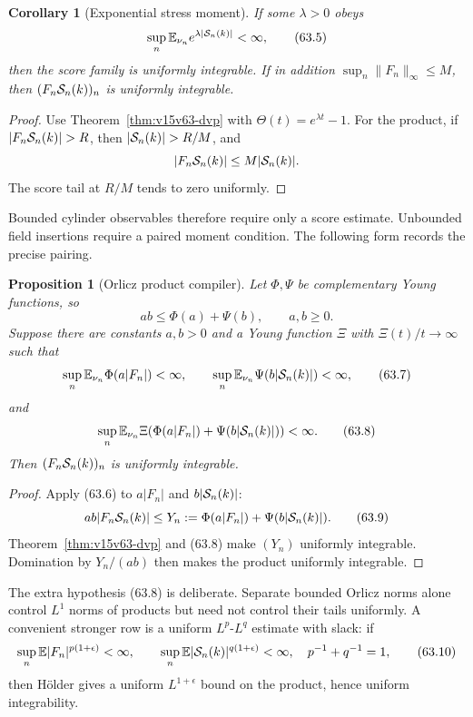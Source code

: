 \documentclass[11pt]{article}
\newtheorem{proposition}[theorem]{Proposition}
\newtheorem{corollary}[theorem]{Corollary}
\theoremstyle{remark}
\begin{document}
\begin{corollary}[Exponential stress moment]
\label{cor:v15v63-exp-ui}
If some \(\lambda>0\) obeys
\[
 \sup_n\mathbb E_{\nu_n}e^{\lambda|{\cal S}_n(k)|}
 <\infty,                                             \tag{63.5}
\]
then the score family is uniformly integrable.  If in addition
\(\sup_n\|F_n\|_\infty\leq M\), then
\((F_n{\cal S}_n(k))_n\) is uniformly integrable.
\end{corollary}

\begin{proof}
Use Theorem~\ref{thm:v15v63-dvp} with
\(\Theta(t)=e^{\lambda t}-1\).  For the product, if
\(|F_n{\cal S}_n(k)|>R\), then
\(|{\cal S}_n(k)|>R/M\), and
\[
 |F_n{\cal S}_n(k)|
 \leq M|{\cal S}_n(k)|.
\]
The score tail at \(R/M\) tends to zero uniformly.
\end{proof}

Bounded cylinder observables therefore require only a score
estimate.  Unbounded field insertions require a paired moment
condition.  The following form records the precise pairing.

\begin{proposition}[Orlicz product compiler]
\label{prop:v15v63-orlicz-product}
Let \(\Phi,\Psi\) be complementary Young functions, so
\[
 ab\leq\Phi(a)+\Psi(b),\qquad a,b\geq0.               \tag{63.6}
\]
Suppose there are constants \(a,b>0\) and a Young function
\(\Xi\) with \(\Xi(t)/t\to\infty\) such that
\[
 \sup_n\mathbb E_{\nu_n}\Phi(a|F_n|)<\infty,
 \qquad
 \sup_n\mathbb E_{\nu_n}\Psi(b|{\cal S}_n(k)|)<\infty, \tag{63.7}
\]
and
\[
 \sup_n\mathbb E_{\nu_n}
 \Xi\!\left(
 \Phi(a|F_n|)+\Psi(b|{\cal S}_n(k)|)
 \right)<\infty.                                     \tag{63.8}
\]
Then \((F_n{\cal S}_n(k))_n\) is uniformly integrable.
\end{proposition}

\begin{proof}
Apply (63.6) to \(a|F_n|\) and \(b|{\cal S}_n(k)|\):
\[
 ab|F_n{\cal S}_n(k)|
 \leq
 Y_n:=
 \Phi(a|F_n|)+\Psi(b|{\cal S}_n(k)|).                 \tag{63.9}
\]
Theorem~\ref{thm:v15v63-dvp} and (63.8) make
\((Y_n)\) uniformly integrable.  Domination by \(Y_n/(ab)\)
then makes the product uniformly integrable.
\end{proof}

The extra hypothesis (63.8) is deliberate.  Separate bounded
Orlicz norms alone control \(L^1\) norms of products but need not
control their tails uniformly.  A convenient stronger row is a
uniform \(L^p\)-\(L^q\) estimate with slack: if
\[
 \sup_n\mathbb E|F_n|^{p(1+\epsilon)}<\infty,\qquad
 \sup_n\mathbb E|{\cal S}_n(k)|^{q(1+\epsilon)}<\infty,
 \quad p^{-1}+q^{-1}=1,                               \tag{63.10}
\]
then H\"older gives a uniform \(L^{1+\epsilon}\) bound on the
product, hence uniform integrability.
\end{document}
